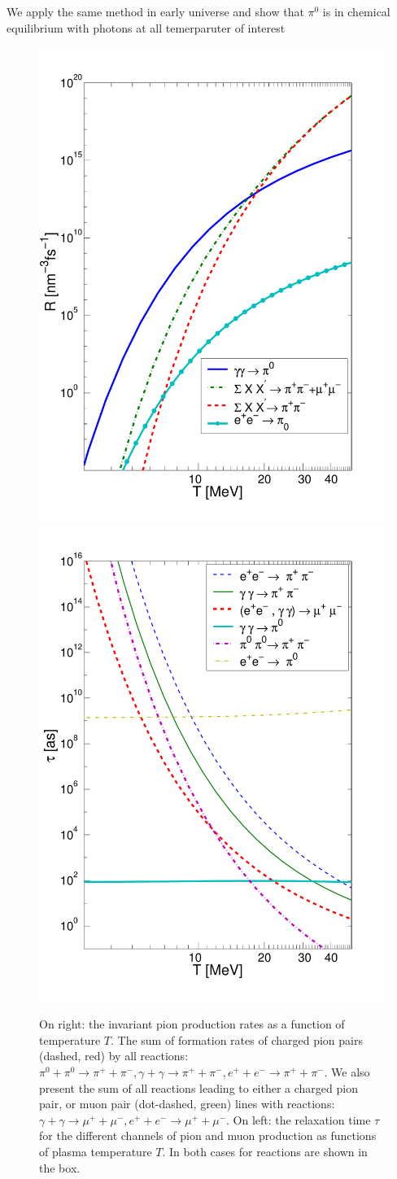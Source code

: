 \documentclass[Universe,article,submit,moreauthors,pdftex]{Definitions/mdpi}
\begin{document}
We apply the same method in early universe and show that $\pi^0$ is in chemical equilibrium with photons at all temerparuter of interest \cite{Kuznetsova:2009xh}
\begin{figure}[t]
\includegraphics[width=0.47\columnwidth]{pions1.pdf}
\includegraphics[width=0.47\columnwidth]{taumupi.pdf}
\caption{On right: the invariant pion production rates as a function of temperature $T$. The sum of formation rates of charged pion pairs (dashed, red) by all reactions: $\pi^{0}+\pi^{0}\to \pi^{+}+\pi^{-},  \gamma+\gamma \to \pi^{+}+\pi^{-}, e^++e^-\to \pi^{+}+\pi^{-}$.
We also present the sum of all reactions leading to either a charged pion pair, or muon pair (dot-dashed, green) lines with reactions:$\gamma+\gamma \to \mu^{+}+\mu^{-}, e^++e^-\to \mu^{+}+\mu^{-}$.
On left: the relaxation time $\tau$ for  the different channels
of pion and muon production as functions of plasma temperature $T$. In both cases for reactions are shown in the box.}
\label{taumupi}
\end{figure}
\end{document}
